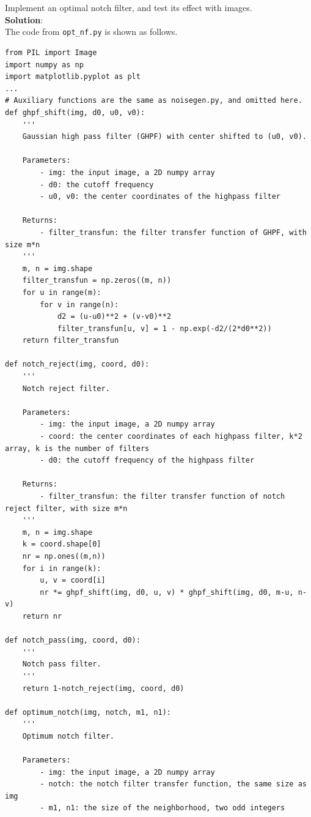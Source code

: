 \documentclass[UTF8]{ctexart}
\begin{document}
\newpage
\section{}
Implement an optimal notch filter, and test its effect with images.\\
\textbf{Solution}:\\
The code from \texttt{opt\_nf.py} is shown as follows.\\

\begin{lstlisting}
from PIL import Image
import numpy as np
import matplotlib.pyplot as plt
...
# Auxiliary functions are the same as noisegen.py, and omitted here.
def ghpf_shift(img, d0, u0, v0):
    '''
    Gaussian high pass filter (GHPF) with center shifted to (u0, v0).
    
    Parameters:
        - img: the input image, a 2D numpy array
        - d0: the cutoff frequency
        - u0, v0: the center coordinates of the highpass filter
        
    Returns:
        - filter_transfun: the filter transfer function of GHPF, with size m*n
    '''
    m, n = img.shape
    filter_transfun = np.zeros((m, n))
    for u in range(m):
        for v in range(n):
            d2 = (u-u0)**2 + (v-v0)**2
            filter_transfun[u, v] = 1 - np.exp(-d2/(2*d0**2))
    return filter_transfun

def notch_reject(img, coord, d0):
    '''
    Notch reject filter.
    
    Parameters:
        - img: the input image, a 2D numpy array
        - coord: the center coordinates of each highpass filter, k*2 array, k is the number of filters
        - d0: the cutoff frequency of the highpass filter
        
    Returns:
        - filter_transfun: the filter transfer function of notch reject filter, with size m*n
    '''
    m, n = img.shape
    k = coord.shape[0]
    nr = np.ones((m,n))
    for i in range(k):
        u, v = coord[i]
        nr *= ghpf_shift(img, d0, u, v) * ghpf_shift(img, d0, m-u, n-v)
    return nr

def notch_pass(img, coord, d0):
    '''
    Notch pass filter.
    '''
    return 1-notch_reject(img, coord, d0)

def optimum_notch(img, notch, m1, n1):
    '''
    Optimum notch filter.
    
    Parameters:
        - img: the input image, a 2D numpy array
        - notch: the notch filter transfer function, the same size as img
        - m1, n1: the size of the neighborhood, two odd integers
        

\end{lstlisting}
\end{document}
